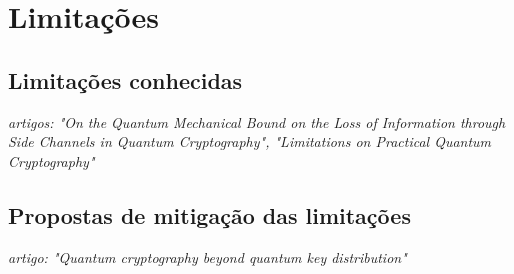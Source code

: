 \chapter{Limitações}

\section{Limitações conhecidas}

\textit{artigos: "On the Quantum Mechanical Bound on the Loss of Information through Side Channels in Quantum Cryptography", "Limitations on Practical Quantum Cryptography"}

\section{Propostas de mitigação das limitações}

\textit{artigo: "Quantum cryptography beyond quantum key distribution"}
